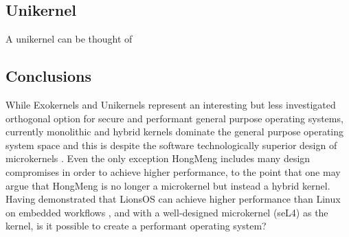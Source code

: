 \documentclass[../thesis.tex]{subfiles}
\begin{document}

    \subsection{Unikernel}
    A unikernel can be thought of 

\subsection{Conclusions}
While Exokernels and Unikernels represent an interesting but less investigated orthogonal option for secure and performant general purpose operating systems, currently monolithic and hybrid kernels dominate the general purpose operating system space and this is despite the software technologically superior design of microkernels \citep{Liedtke_95}. Even the only exception HongMeng includes many design compromises in order to achieve higher performance, to the point that one may argue that HongMeng is no longer a microkernel but instead a hybrid kernel. Having demonstrated that LionsOS can achieve higher performance than Linux on embedded workflows \citep{Heiser_VCJGNLDZAZWPDB_25}, and with a well-designed microkernel (seL4) as the kernel, is it possible to create a performant operating system?

\end{document}
